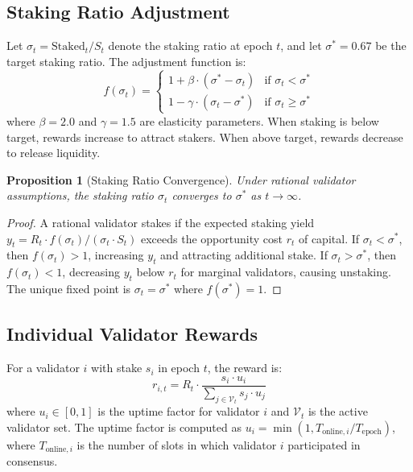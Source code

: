 \documentclass[11pt,a4paper]{article}
\newtheorem{proposition}[theorem]{Proposition}
\begin{document}
\subsection{Staking Ratio Adjustment}

Let $\sigma_t = \text{Staked}_t / S_t$ denote the staking ratio at epoch $t$, and let $\sigma^* = 0.67$ be the target staking ratio. The adjustment function is:
\begin{equation}\label{eq:staking_adj}
    f(\sigma_t) = \begin{cases}
        1 + \beta \cdot (\sigma^* - \sigma_t) & \text{if } \sigma_t < \sigma^* \\
        1 - \gamma \cdot (\sigma_t - \sigma^*) & \text{if } \sigma_t \geq \sigma^*
    \end{cases}
\end{equation}
where $\beta = 2.0$ and $\gamma = 1.5$ are elasticity parameters. When staking is below target, rewards increase to attract stakers. When above target, rewards decrease to release liquidity.

\begin{proposition}[Staking Ratio Convergence]
Under rational validator assumptions, the staking ratio $\sigma_t$ converges to $\sigma^*$ as $t \to \infty$.
\end{proposition}

\begin{proof}
A rational validator stakes if the expected staking yield $y_t = R_t \cdot f(\sigma_t) / (\sigma_t \cdot S_t)$ exceeds the opportunity cost $r_t$ of capital. If $\sigma_t < \sigma^*$, then $f(\sigma_t) > 1$, increasing $y_t$ and attracting additional stake. If $\sigma_t > \sigma^*$, then $f(\sigma_t) < 1$, decreasing $y_t$ below $r_t$ for marginal validators, causing unstaking. The unique fixed point is $\sigma_t = \sigma^*$ where $f(\sigma^*) = 1$.
\end{proof}

\subsection{Individual Validator Rewards}

For a validator $i$ with stake $s_i$ in epoch $t$, the reward is:
\begin{equation}
    r_{i,t} = R_t \cdot \frac{s_i \cdot u_i}{\sum_{j \in \mathcal{V}_t} s_j \cdot u_j}
\end{equation}
where $u_i \in [0,1]$ is the uptime factor for validator $i$ and $\mathcal{V}_t$ is the active validator set. The uptime factor is computed as $u_i = \min(1, T_{\text{online},i} / T_{\text{epoch}})$, where $T_{\text{online},i}$ is the number of slots in which validator $i$ participated in consensus.
\end{document}
